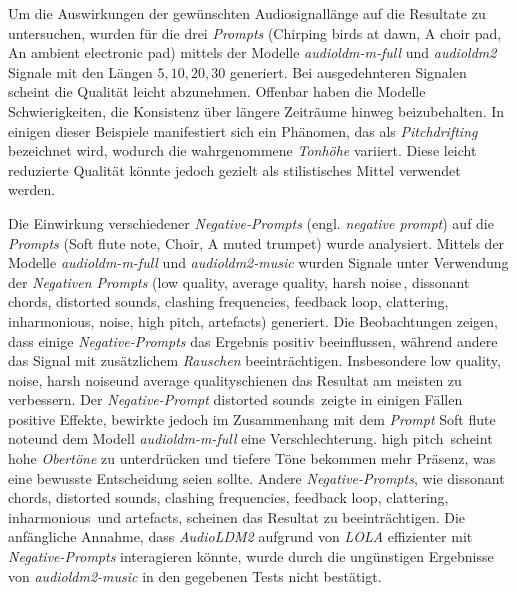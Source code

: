 \documentclass[
  a4paper,  %
  twoside,  %
  bibliography=totoc,
  headsepline,
  cleardoublepage=empty,
  parskip=half,
  draft=false
]{scrbook}
\begin{document}
Um die Auswirkungen der gewünschten Audiosignallänge auf die Resultate zu untersuchen, wurden für die drei \emph{Prompts} (\glqq Chirping birds at dawn\grqq, \glqq A choir pad\grqq, \glqq An ambient electronic pad\grqq) mittels der Modelle \emph{audioldm-m-full} \cite{noauthor_cvsspaudioldm-m-full_nodate} und \emph{audioldm2} \cite{noauthor_cvsspaudioldm2_nodate} Signale mit den Längen $5,10,20,30$ generiert. Bei ausgedehnteren Signalen scheint die Qualität leicht abzunehmen. Offenbar haben die Modelle Schwierigkeiten, die Konsistenz über längere Zeiträume hinweg beizubehalten. In einigen dieser Beispiele manifestiert sich ein Phänomen, das als \emph{Pitchdrifting} bezeichnet wird, wodurch die wahrgenommene \emph{Tonhöhe} variiert. Diese leicht reduzierte Qualität könnte jedoch gezielt als stilistisches Mittel verwendet werden.

Die Einwirkung verschiedener \emph{Negative-Prompts} (engl. \emph{negative prompt}) auf die \emph{Prompts} (\glqq Soft flute note\grqq, \glqq Choir\grqq, \glqq A muted trumpet\grqq) wurde analysiert. Mittels der Modelle \emph{audioldm-m-full} \cite{noauthor_cvsspaudioldm-m-full_nodate} und \emph{audioldm2-music} \cite{noauthor_cvsspaudioldm2-music_nodate} wurden Signale unter Verwendung der \emph{Negativen Prompts} (\glqq low quality\grqq, \glqq average quality\grqq, \glqq harsh noise\grqq \,, \glqq dissonant chords\grqq, \glqq distorted sounds\grqq, \glqq clashing frequencies\grqq, \glqq feedback loop\grqq, \glqq clattering\grqq, \glqq inharmonious\grqq, \glqq noise\grqq, \glqq high pitch\grqq, \glqq artefacts\grqq) generiert. Die Beobachtungen zeigen, dass einige \emph{Negative-Prompts} das Ergebnis positiv beeinflussen, während andere das Signal mit zusätzlichem \emph{Rauschen} beeinträchtigen. Insbesondere \glqq low quality\grqq, \glqq noise\grqq, \glqq harsh noise\grqq und \glqq average quality\grqq schienen das Resultat am meisten zu verbessern. Der \emph{Negative-Prompt} \glqq distorted sounds\grqq \, zeigte in einigen Fällen positive Effekte, bewirkte jedoch im Zusammenhang mit dem \emph{Prompt} \glqq Soft flute note\grqq und dem Modell \emph{audioldm-m-full} eine Verschlechterung. \glqq high pitch\grqq \, scheint hohe \emph{Obertöne} zu unterdrücken und tiefere Töne bekommen mehr Präsenz, was eine bewusste Entscheidung seien sollte. Andere \emph{Negative-Prompts}, wie \glqq dissonant chords\grqq, \glqq distorted sounds\grqq, \glqq clashing frequencies\grqq, \glqq feedback loop\grqq, \glqq clattering\grqq, \glqq inharmonious\grqq \, und \glqq artefacts\grqq, scheinen das Resultat zu beeinträchtigen. Die anfängliche Annahme, dass \emph{AudioLDM2} aufgrund von \emph{LOLA} effizienter mit \emph{Negative-Prompts} interagieren könnte, wurde durch die ungünstigen Ergebnisse von \emph{audioldm2-music} in den gegebenen Tests nicht bestätigt.
\end{document}
